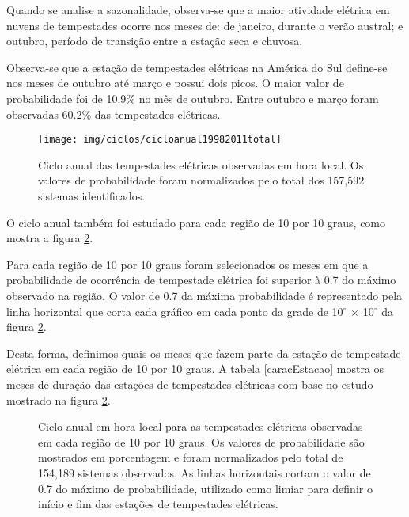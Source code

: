 Quando se analise a sazonalidade, observa-se que a maior atividade elétrica em nuvens de tempestades ocorre nos meses de: de janeiro, durante o verão austral; e outubro, período de transição entre a estação seca e chuvosa.

Observa-se que a estação de tempestades elétricas na América do Sul define-se nos meses de outubro até março e possui dois picos. O maior valor de probabilidade foi de 10.9\%  no mês de outubro. Entre outubro e março foram observadas 60.2\% das tempestades elétricas. %

\begin{figure}[!hb]
\centering
{\texttt{[image: img/ciclos/cicloanual19982011total]}}
\caption{Ciclo anual das tempestades elétricas observadas em hora local. Os valores de probabilidade foram normalizados pelo total dos 157,592 sistemas identificados.}
\label{cicloanualtotal}
\end{figure} 


O ciclo anual também foi estudado para cada região de 10 por 10 graus, como mostra a figura \ref{anual}.

Para cada região de 10 por 10 graus foram selecionados os meses em que a probabilidade de ocorrência de tempestade elétrica foi superior à 0.7 do máximo observado na região. O valor de 0.7 da máxima probabilidade é representado pela linha horizontal que corta cada gráfico em cada ponto da grade de 10$^{\circ}$ $\times$ 10$^{\circ}$ da figura \ref{anual}. 

Desta forma, definimos quais os meses que fazem parte da estação de tempestade elétrica em cada região de 10 por 10 graus. A tabela \ref{caracEstacao} mostra os meses de duração das estações de tempestades elétricas com base no estudo mostrado na figura \ref{anual}. 



\begin{figure}[!ht]
\caption{Ciclo anual em hora local para as tempestades elétricas observadas em cada região de 10 por 10 graus. Os valores de probabilidade são mostrados em porcentagem e foram normalizados pelo total de 154,189 sistemas observados. As linhas horizontais cortam o valor de 0.7 do máximo de probabilidade, utilizado como limiar para definir o início e fim das estações de tempestades elétricas.}
\label{anual}
\end{figure}



